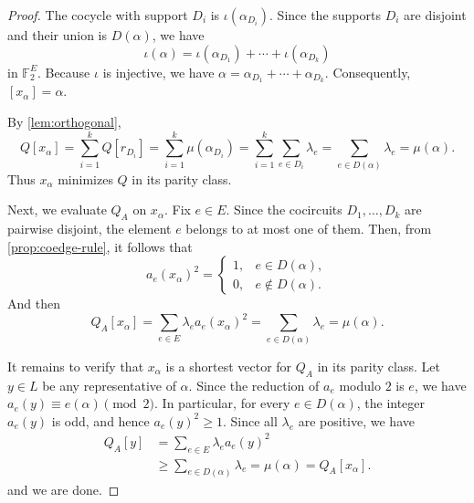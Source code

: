 \documentclass[10pt,a4paper]{amsart}
\begin{document}
\begin{proof}
    The cocycle with support $D_i$ is $\iota(\alpha_{D_i})$. Since the
supports $D_i$ are disjoint and their union is $D(\alpha)$, we have
\[
    \iota(\alpha)
    =
    \iota(\alpha_{D_1})
    +\cdots+
    \iota(\alpha_{D_k})
\]
in $\mathbb F_2^E$. Because $\iota$ is injective, we have $\alpha = \alpha_{D_1}+\cdots+\alpha_{D_k}.$ Consequently, $[x_\alpha]=\alpha$.

By \cref{lem:orthogonal},
\[
    Q[x_\alpha] =
    \sum_{i=1}^k Q[r_{D_i}] =
    \sum_{i=1}^k \mu(\alpha_{D_i}) =
    \sum_{i=1}^k\sum_{e\in D_i}\lambda_e =
    \sum_{e\in D(\alpha)}\lambda_e =
    \mu(\alpha).
\]
Thus $x_\alpha$ minimizes $Q$ in its parity class.

Next, we evaluate $Q_A$ on $x_\alpha$. Fix $e\in E$. Since the
cocircuits $D_1,\ldots,D_k$ are pairwise disjoint, the element $e$
belongs to at most one of them. Then, from \cref{prop:coedge-rule},
it follows that
\[
    a_e(x_\alpha)^2
    =
    \begin{cases}
        1, & e\in D(\alpha),\\
        0, & e\notin D(\alpha).
    \end{cases}
\]
And then
\[
    Q_A[x_\alpha]
    =
    \sum_{e\in E}\lambda_e a_e(x_\alpha)^2
    =
    \sum_{e\in D(\alpha)}\lambda_e
    =
    \mu(\alpha).
\]

It remains to verify that $x_\alpha$ is a shortest vector for $Q_A$ in its parity class. Let $y\in L$ be any representative of $\alpha$. Since the reduction of $a_e$ modulo $2$ is $e$, we have $a_e(y)\equiv e(\alpha)\pmod 2.$ In particular, for every $e\in D(\alpha)$, the integer $a_e(y)$ is
odd, and hence $a_e(y)^2\geq1.$ Since all $\lambda_e$ are positive, we have
\begin{align*}
    Q_A[y]
    &=
    \sum_{e\in E}\lambda_e a_e(y)^2 \\
    &\geq
    \sum_{e\in D(\alpha)}\lambda_e =
    \mu(\alpha) =
    Q_A[x_\alpha].
\end{align*}
and we are done.
\end{proof}
\end{document}
